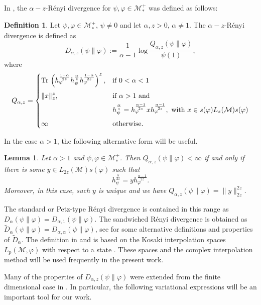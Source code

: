 \documentclass[12pt]{article}
\newtheorem{lemma}[theorem]{Lemma}
\theoremstyle{definition}
\newtheorem{defi}[theorem]{Definition}
\theoremstyle{remark}
\numberwithin{equation}{section}
\def\Me{\mathcal M}
\def \Tr{\mathrm{Tr}\,}
\begin{document}
In \cite{kato2023aremark, kato2023onrenyi}, the
$\alpha-z$-R\'enyi divergence for $\psi,\varphi\in \mathcal M_*^+$  was defined as
follows: 
\begin{defi}\label{defi:renyi} Let $\psi,\varphi\in \Me_*^+$, $\psi\ne 0$ and let
$\alpha,z>0$, $\alpha\ne 1$. The $\alpha-z$-R\'enyi divergence is defined as 
\[
D_{\alpha,z}(\psi\|\varphi):=\frac1{\alpha-1}\log
\frac{Q_{\alpha,z}(\psi\|\varphi)}{\psi(1)},
\]
where
\[
Q_{\alpha,z}=\begin{dcases} \Tr
\left(h_\varphi^{\frac{1-\alpha}{2z}}h_\psi^{\frac{\alpha}{z}}h_\varphi^{\frac{1-\alpha}{2z}}\right)^z, &
\text{if } 0<\alpha<1\\[0.3em]
\|x\|_z^z, & \text{if } \alpha>1 \text{ and }\\
\ &
h_\psi^{\frac{\alpha}{z}}=h_\varphi^{\frac{\alpha-1}{2z}}xh_\varphi^{\frac{\alpha-1}{2z}},\text{ with }
x\in s(\varphi)L_z(\Me)s(\varphi)\\[0.3em]
\infty& \text{otherwise}.
\end{dcases}
\]
\end{defi}


In the case $\alpha>1$, the following alternative form will be useful.

\begin{lemma}\cite[Lemma 7]{kato2023onrenyi} \label{lemma:renyi_2z}
Let $\alpha>1$ and $\psi,\varphi\in \Me_*^+$. Then $Q_{\alpha,z}(\psi\|\varphi)<\infty$ if
and only if there is some $y\in L_{2z}(\Me)s(\varphi)$ such that 
\[
h_\psi^{\frac{\alpha}{2z}}=yh_\varphi^{\frac{\alpha-1}{2z}}.
\]
Moreover, in this case, such $y$ is unique and we have
$Q_{\alpha,z}(\psi\|\varphi)=\|y\|_{2z}^{2z}$. 
\end{lemma}

The standard or Petz-type R\'enyi divergence \cite{petz1985quasi, hiai2018quantum, hiai2021quantum} is
contained in this range as $D_\alpha(\psi\|\varphi)=D_{\alpha,1}(\psi\|\varphi)$. The
sandwiched R\'enyi divergence  is obtained as $\tilde
D_\alpha(\psi\|\varphi)=D_{\alpha,\alpha}(\psi\|\varphi)$, see
\cite{berta2018renyi,hiai2021quantum,jencova2018renyi, jencova2021renyi} for some
alternative definitions and properties of $\tilde D_\alpha$. The definition in
\cite{jencova2018renyi} and \cite{jencova2021renyi} is based on the Kosaki interpolation
spaces  $L_p(\Me,\varphi)$ with respect to a state \cite{kosaki1984applications}. These
spaces and the
complex interpolation method will be used frequently in the present work. 


Many of the  properties of $D_{\alpha,z}(\psi\|\varphi)$ 
were extended from the finite dimensional case in \cite{kato2023onrenyi}. In particular,
the following variational expressions will be an important tool for our work.
\end{document}
